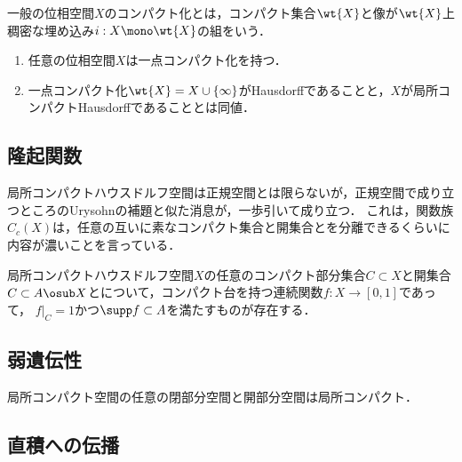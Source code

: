 \documentclass[uplatex,dvipdfmx]{jsreport}
\begin{document}
\begin{definition}
    一般の位相空間$X$のコンパクト化とは，コンパクト集合$\wt{X}$と像が$\wt{X}$上稠密な埋め込み$i:X\mono\wt{X}$の組をいう．
\end{definition}

\begin{proposition}\mbox{}
    \begin{enumerate}
        \item 任意の位相空間$X$は一点コンパクト化を持つ．
        \item 一点コンパクト化$\wt{X}=X\cup\{\infty\}$がHausdorffであることと，$X$が局所コンパクトHausdorffであることとは同値．
    \end{enumerate}
\end{proposition}

\subsection{隆起関数}

\begin{tcolorbox}[colframe=ForestGreen, colback=ForestGreen!10!white,breakable,colbacktitle=ForestGreen!40!white,coltitle=black,fonttitle=\bfseries\sffamily,
title=]
    局所コンパクトハウスドルフ空間は正規空間とは限らないが，正規空間で成り立つところのUrysohnの補題と似た消息が，一歩引いて成り立つ．
    これは，関数族$C_c(X)$は，任意の互いに素なコンパクト集合と開集合とを分離できるくらいに内容が濃いことを言っている．
\end{tcolorbox}

\begin{proposition}
    局所コンパクトハウスドルフ空間$X$の任意のコンパクト部分集合$C\subset X$と開集合$C\subset A\osub X$とについて，コンパクト台を持つ連続関数$f:X\to[0,1]$であって，
    $f|_C=1$かつ$\supp f\subset A$を満たすものが存在する．
\end{proposition}

\subsection{弱遺伝性}

\begin{proposition}[局所コンパクト性は弱遺伝的である]
    局所コンパクト空間の任意の閉部分空間と開部分空間は局所コンパクト．
\end{proposition}

\subsection{直積への伝播}
\end{document}
